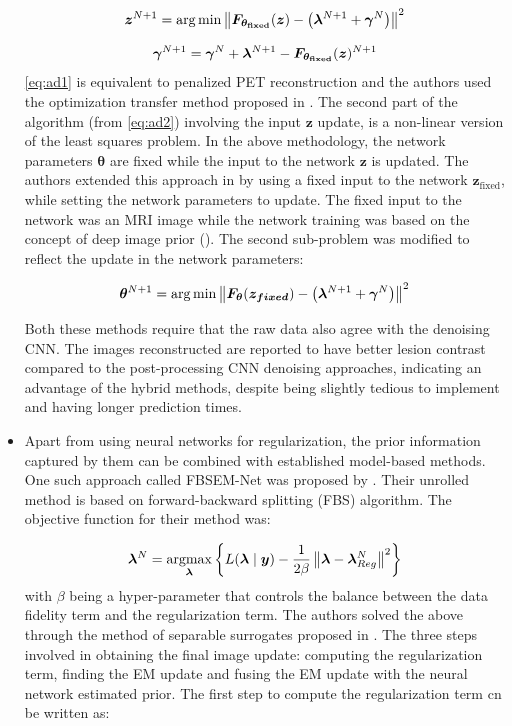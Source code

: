 \begin{itemize}
\begin{equation}\label{eq:ad2}
\bm{z}^{N+1}=\arg \min \left\|\bm{F}_{\bm{\theta_{\mathrm{fixed}}}}(\bm{z})-\left(\bm{\lambda}^{N+1}+\bm{\gamma}^{N}\right)\right\|^{2}
\end{equation}

\begin{equation}\label{eq:ad3}
\bm{\gamma}^{N+1}=\bm{\gamma}^{N}+\bm{\lambda}^{N+1}-\bm{F}_{\bm{\theta_{\mathrm{fixed}}}}(\bm{z})^{N+1}
\end{equation}
\ref{eq:ad1} is equivalent to penalized \ac{PET} reconstruction and the authors used the optimization transfer method proposed in \cite{wang2012penalized}. The second part of the algorithm (from \ref{eq:ad2}) involving the input $\bm{z}$ update, is a non-linear version of the least squares problem. In the above methodology, the network parameters $\bm{\theta}$ are fixed while the input to the network $\bm{z}$ is updated. The authors extended this approach in \cite{gong2018pet2} by using a fixed input to the network $\bm{z}_{\mathrm{fixed}}$, while setting the network parameters to update. The fixed input to the network was an MRI image while the network training was based on the concept of deep image prior (\cite{ulyanov2018deep}). The second sub-problem was modified to reflect the update in the network parameters:

\begin{equation}\label{eq:dip}
\bm{\theta}^{N+1}=\arg \min \left\|\bm{F}_{\bm{\theta}}(\bm{z_{fixed}})-\left(\bm{\lambda}^{N+1}+\bm{\gamma}^{N}\right)\right\|^{2}
\end{equation}

Both these methods require that the raw data also agree with the denoising \ac{CNN}. The images reconstructed are reported to have better lesion contrast compared to the post-processing \ac{CNN} denoising approaches, indicating an advantage of the hybrid methods, despite being slightly tedious to implement and having longer prediction times.

\item Apart from using neural networks for regularization, the prior information captured by them can be combined with established model-based methods. One such approach called FBSEM-Net was proposed by \cite{mehranian2020model}. Their unrolled method is based on forward-backward splitting (FBS) algorithm. The objective function for their method was:

\begin{equation}
\bm{\lambda}^{N}=\underset{\bm{\lambda}}{\operatorname{argmax}}\left\{L(\bm{\lambda} \mid \bm{y})-\frac{1}{2 \beta}\left\|\bm{\lambda}-\bm{\lambda}_{R e g}^{N}\right\|^{2}\right\}
\end{equation}
with $\beta$ being a hyper-parameter that controls the balance between the data fidelity term and the regularization term. The authors solved the above through the method of separable surrogates proposed in \cite{depierro1995}. The three steps involved in obtaining the final image update: computing the regularization term, finding the EM update and fusing the EM update with the neural network estimated prior. The first step to compute the regularization term cn be written as:


\end{itemize}
